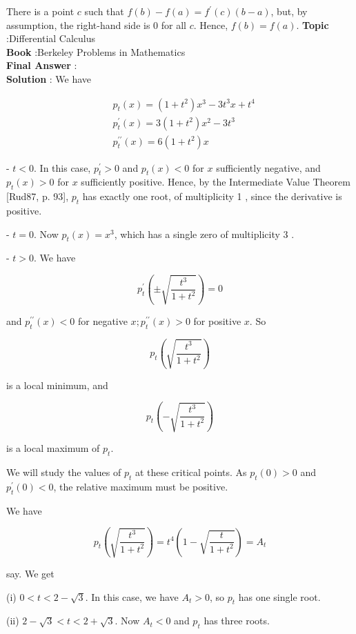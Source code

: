 \documentclass[10pt]{article}
\begin{document}
There is a point $c$ such that $f(b)-f(a)=f^{\prime}(c)(b-a)$, but, by assumption, the right-hand side is 0 for all $c$. Hence, $f(b)=f(a)$.
\textbf{Topic} :Differential Calculus \\
\textbf{Book} :Berkeley Problems in Mathematics\\
\textbf{Final Answer} :\\


\textbf{Solution} : We have

$$
\begin{aligned}
&p_{t}(x)=\left(1+t^{2}\right) x^{3}-3 t^{3} x+t^{4} \\
&p_{t}^{\prime}(x)=3\left(1+t^{2}\right) x^{2}-3 t^{3} \\
&p_{t}^{\prime \prime}(x)=6\left(1+t^{2}\right) x
\end{aligned}
$$

- $t<0$. In this case, $p_{t}^{\prime}>0$ and $p_{t}(x)<0$ for $x$ sufficiently negative, and $p_{t}(x)>0$ for $x$ sufficiently positive. Hence, by the Intermediate Value Theorem [Rud87, p. 93], $p_{t}$ has exactly one root, of multiplicity 1 , since the derivative is positive.

- $t=0$. Now $p_{t}(x)=x^{3}$, which has a single zero of multiplicity 3 .

- $t>0$. We have

$$
p_{t}^{\prime}\left(\pm \sqrt{\frac{t^{3}}{1+t^{2}}}\right)=0
$$

and $p_{t}^{\prime \prime}(x)<0$ for negative $x ; p_{t}^{\prime \prime}(x)>0$ for positive $x$. So

$$
p_{t}\left(\sqrt{\frac{t^{3}}{1+t^{2}}}\right)
$$

is a local minimum, and

$$
p_{t}\left(-\sqrt{\frac{t^{3}}{1+t^{2}}}\right)
$$

is a local maximum of $p_{t}$.

We will study the values of $p_{t}$ at these critical points. As $p_{t}(0)>0$ and $p_{t}^{\prime}(0)<0$, the relative maximum must be positive.

We have

$$
p_{t}\left(\sqrt{\frac{t^{3}}{1+t^{2}}}\right)=t^{4}\left(1-\sqrt{\frac{t}{1+t^{2}}}\right)=A_{t}
$$

say. We get

(i) $0<t<2-\sqrt{3}$. In this case, we have $A_{t}>0$, so $p_{t}$ has one single root.

(ii) $2-\sqrt{3}<t<2+\sqrt{3}$. Now $A_{t}<0$ and $p_{t}$ has three roots.
\end{document}
